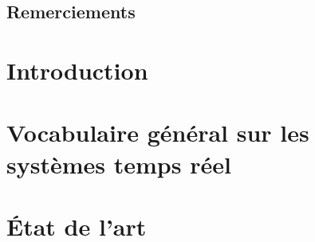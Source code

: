\documentclass[11pt,a4paper,oneside]{report}
\begin{document}
	\newenvironment{vcenterpage}
	{\newpage\thispagestyle{empty} 
		\vspace*{\fill}}
	{\vspace*{\fill}\par\pagebreak}
	
	\thispagestyle{empty} 
	\setcounter{page}{0}
	\tableofcontents
	
%	

	

	
\section*{Remerciements}

\newpage

\chapter*{Introduction}{}
	\setcounter{page}{1}

	
		
\chapter{Vocabulaire général sur les systèmes temps réel}
	
	
\chapter{État de l'art}
	
\end{document}
